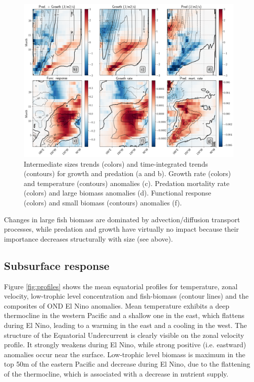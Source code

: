 \begin{figure}[h!tp]
	\centering
	\includegraphics[scale=0.4]{figs/fig9.png}	
	\caption{Intermediate sizes trends (colors) and time-integrated trends (contours) for growth and predation (a and b). Growth rate (colors) and temperature (contours) anomalies (c). Predation mortality rate (colors) and large biomass anomalies (d). Functional response (colors) and small biomass (contours) anomalies (f).}	
	\label{fig:fig9}
\end{figure}

Changes in large fish biomass are dominated by advection/diffusion transport processes, while predation and growth have virtually no impact because their importance decreases structurally with size (see above). 


\subsection{Subsurface response}

Figure \ref{fig:profiles} shows the mean equatorial profiles for temperature, zonal velocity, low-trophic level concentration and fish-biomass (contour lines) and the composites of OND El Nino anomalies. Mean temperature exhibits a deep thermocline in the western Pacific and a shallow one in the east, which flattens during El Nino, leading to a warming in the east and a cooling in the west. The structure of the Equatorial Undercurrent is clearly visible on the zonal velocity profile. It strongly weakens during El Nino, while strong positive (i.e. eastward) anomalies occur near the surface. Low-trophic level biomass is maximum in the top 50m of the eastern Pacific and decrease during El Nino, due to the flattening of the thermocline, which is associated with a decrease in nutrient supply.

